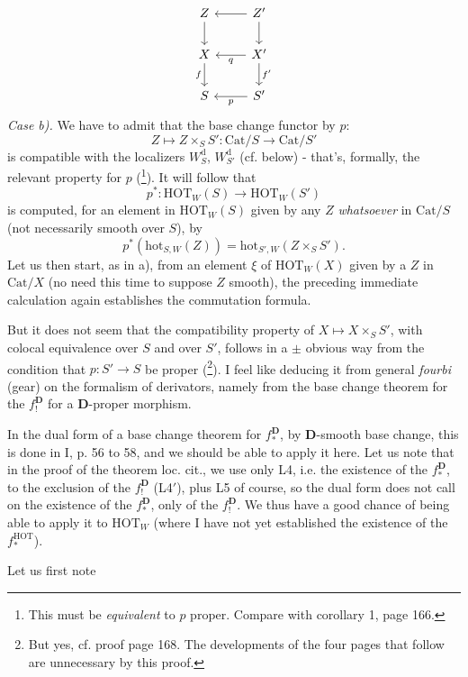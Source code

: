 \documentclass[11pt]{article}
\newcommand{\printedpage}[1]{\marginpar{\footnotesize p.~#1}}
\newcommand{\msp}[1]{\marginpar{\footnotesize [#1]}}
\newcommand{\HOT}{\mathrm{HOT}}
\newcommand{\hot}{\mathrm{hot}}
\newcommand{\Cat}{\mathrm{Cat}}
\newcommand{\D}{\mathbf{D}}
\begin{document}
\noindent\printedpage{100}%
\[
\begin{tikzcd}
Z \arrow[d] & Z' \arrow[l] \arrow[d] \\
X \arrow[d, "f"'] & X' \arrow[l, "q"] \arrow[d, "f'"] \\
S & S' \arrow[l, "p"]
\end{tikzcd}
\]
\textit{Case b).} We have to admit that \msp{page 163}the base change functor by $p$:
\[
Z \longmapsto Z \times_S S' : \Cat/S \longrightarrow \Cat/S'
\]
is compatible with the localizers $W^{\mathrm{d}}_{S}$, $W^{\mathrm{d}}_{S'}$ (cf. below) - that's, formally, the relevant property for $p$ (\footnote[79]{This must be \textit{equivalent} to $p$ proper. Compare with corollary 1, page 166.}). It will follow that %
\[
p^* : \HOT_W(S) \longrightarrow \HOT_W(S')
\]
is computed, for an element in $\HOT_W(S)$ given by any $Z$ \textit{whatsoever} in $\Cat/S$ (not necessarily smooth over $S$), by
\[
p^*(\hot_{S,W}(Z)) = \hot_{S',W}(Z \times_S S').
\]
Let us then start, as in a), from an element $\xi$ of $\HOT_W(X)$ given by a $Z$ in $\Cat/X$ (no need this time to suppose $Z$ smooth), the preceding immediate calculation again establishes the commutation formula.

But it does not seem that the compatibility property of $X \longmapsto X \times_S S'$, with colocal equivalence over $S$ and over $S'$, follows in a $\pm$ obvious way from the condition that $p : S' \longrightarrow S$ be proper (\footnote[80]{But yes, cf. proof page 168. The developments of the four pages that follow are unnecessary by this proof.}). I feel like deducing it from general \textit{fourbi} (gear) on the formalism of derivators, namely from the base change theorem for the $f_!^{\D}$ for a $\D$-proper morphism.

\msp{page 164}In the dual form of a base change theorem for $f_*^{\D}$, by $\D$-smooth base change, this is done in I, p. 56 to 58, and we should be able to apply it here. Let us note that in the proof of the theorem loc. cit., we use only L4, i.e. the existence of the $f_*^{\D}$, to the exclusion of the $f_!^{\D}$ (L4$'$), plus L5 of course, so the dual form does not call on the existence of the $f_*^{\D}$, only of the $f_!^{\D}$. We thus have a good chance of being able to apply it to $\HOT_W$ (where I have not yet established the existence of the $f_*^{\mathrm{HOT}}$). %

\noindent\printedpage{101}%
Let us first note
\end{document}
